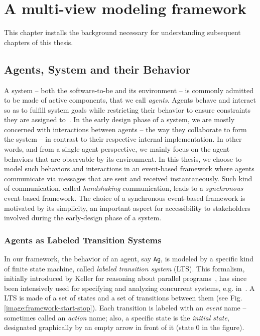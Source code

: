\chapter{A multi-view modeling framework\label{chapter:framework}}

This chapter installs the background necessary for understanding subsequent chapters of this thesis. 


\newcommand{\artifact}[1]{\texttt{#1}}

\section{Agents, System and their Behavior}

A system -- both the software-to-be and its environment -- is commonly admitted to be made of active components, that we call \emph{agents}. Agents behave and interact so as to fulfill system goals while restricting their behavior to ensure constraints they are assigned to~\cite{Feather:1987}. In the early design phase of a system, we are mostly concerned with interactions between agents -- the way they collaborate to form the system -- in contrast to their respective internal implementation. In other words, and from a single agent perspective, we mainly focus on the agent behaviors that are observable by its environment. In this thesis, we choose to model such behaviors and interactions in an event-based framework where agents communicate via messages that are sent and received instantaneously. Such kind of communication, called \emph{handshaking} communication, leads to a \emph{synchronous} event-based framework. The choice of a synchronous event-based framework is motivated by its simplicity, an important aspect for accessibility to stakeholders involved during the early-design phase of a system.

\subsection{Agents as Labeled Transition Systems}

In our framework, the behavior of an agent, say \artifact{Ag}, is modeled by a specific kind of finite state machine, called \emph{labeled transition system} (LTS). This formalism, initially introduced by Keller for reasoning about parallel programs~\cite{Keller:1976}, has since been intensively used for specifying and analyzing concurrent systems, e.g. in~\cite{Milner:1989, Clarke:1989, Magee:1997}. A LTS is made of a set of states and a set of transitions between them (see Fig.\ref{image:framework-start-stop}). Each transition is labeled with an \emph{event} name -- sometimes called an \emph{action} name; also, a specific state is the \emph{initial state}, designated graphically by an empty arrow in front of it (state 0 in the figure).


